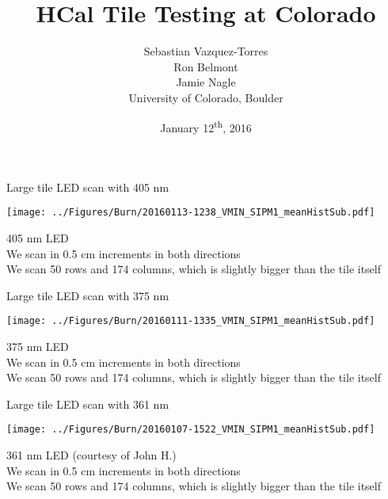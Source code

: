 \documentclass[compress,8pt]{beamer} %
\title[Jan 12, 2016 - Slide \insertframenumber]{HCal Tile Testing at Colorado}
\author[CU-Boulder]{Sebastian Vazquez-Torres \\  Ron Belmont \\ Jamie Nagle \\ \vspace{20pt} University of Colorado, Boulder}
\date{January 12\textsuperscript{th}, 2016}
\begin{document}
\begin{frame}
\titlepage
\end{frame}









\begin{frame}{Large tile LED scan with 405 nm}
\begin{adjustwidth}{-3em}{-3em}
\begin{center}
\texttt{[image: ../Figures/Burn/20160113-1238\_VMIN\_SIPM1\_meanHistSub.pdf]}
\end{center}
\end{adjustwidth}
405 nm LED \\
We scan in 0.5 cm increments in both directions \\
We scan 50 rows and 174 columns, which is slightly bigger than the tile itself
\end{frame}



\begin{frame}{Large tile LED scan with 375 nm}
\begin{adjustwidth}{-3em}{-3em}
\begin{center}
\texttt{[image: ../Figures/Burn/20160111-1335\_VMIN\_SIPM1\_meanHistSub.pdf]}
\end{center}
\end{adjustwidth}
375 nm LED \\
We scan in 0.5 cm increments in both directions \\
We scan 50 rows and 174 columns, which is slightly bigger than the tile itself
\end{frame}



\begin{frame}{Large tile LED scan with 361 nm}
\begin{adjustwidth}{-3em}{-3em}
\begin{center}
\texttt{[image: ../Figures/Burn/20160107-1522\_VMIN\_SIPM1\_meanHistSub.pdf]}
\end{center}
\end{adjustwidth}
361 nm LED (courtesy of John H.) \\
We scan in 0.5 cm increments in both directions \\
We scan 50 rows and 174 columns, which is slightly bigger than the tile itself
\end{frame}
\end{document}
